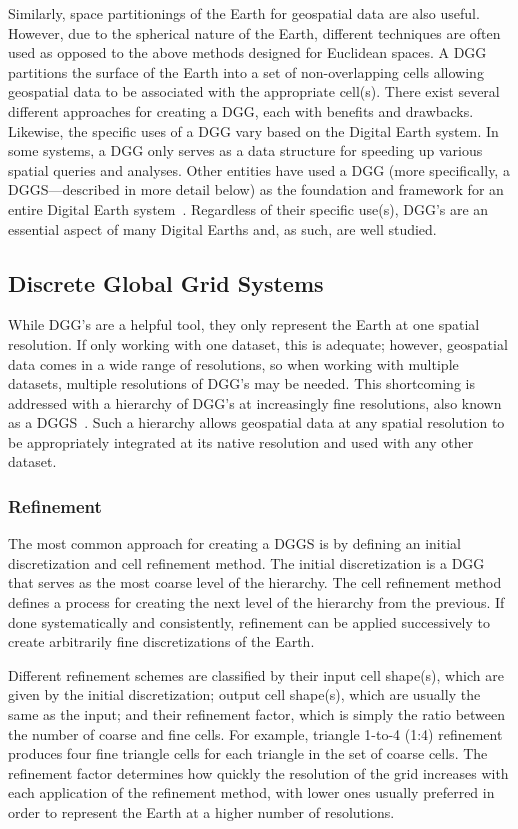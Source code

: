 Similarly, space partitionings of the Earth for geospatial data are also useful.
However, due to the spherical nature of the Earth, different techniques are often used as opposed to the above methods designed for Euclidean spaces.
A DGG partitions the surface of the Earth into a set of non-overlapping cells allowing geospatial data to be associated with the appropriate cell(s).
There exist several different approaches for creating a DGG, each with benefits and drawbacks.
Likewise, the specific uses of a DGG vary based on the Digital Earth system.
In some systems, a DGG only serves as a data structure for speeding up various spatial queries and analyses.
Other entities have used a DGG (more specifically, a DGGS---described in more detail below) as the foundation and framework for an entire Digital Earth system~\cite{peterson2011close}.
Regardless of their specific use(s), DGG's are an essential aspect of many Digital Earths and, as such, are well studied.


\subsection{Discrete Global Grid Systems} \label{chap:2:DGGS}
While DGG's are a helpful tool, they only represent the Earth at one spatial resolution.
If only working with one dataset, this is adequate; however, geospatial data comes in a wide range of resolutions, so when working with multiple datasets, multiple resolutions of DGG's may be needed.
This shortcoming is addressed with a hierarchy of DGG's at increasingly fine resolutions, also known as a DGGS~\cite{sahr1998discrete, sahr2003geodesic}.
Such a hierarchy allows geospatial data at any spatial resolution to be appropriately integrated at its native resolution and used with any other dataset.


\subsubsection{Refinement} \label{chap:2:refinement}
The most common approach for creating a DGGS is by defining an initial discretization and cell refinement method.
The initial discretization is a DGG that serves as the most coarse level of the hierarchy. The cell refinement method defines a process for creating the next level of the hierarchy from the previous.
If done systematically and consistently, refinement can be applied successively to create arbitrarily fine discretizations of the Earth.


Different refinement schemes are classified by their input cell shape(s), which are given by the initial discretization; output cell shape(s), which are usually the same as the input; and their refinement factor, which is simply the ratio between the number of coarse and fine cells.
For example, triangle 1-to-4 (1:4) refinement produces four fine triangle cells for each triangle in the set of coarse cells.
The refinement factor determines how quickly the resolution of the grid increases with each application of the refinement method, with lower ones usually preferred in order to represent the Earth at a higher number of resolutions.


